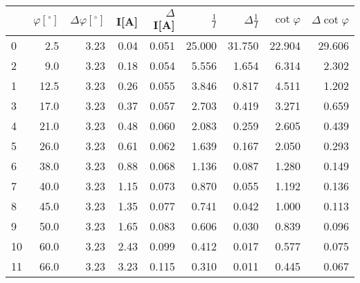 \begin{tabular}{lrrrrrrrr}
\toprule
{} &  $\varphi[^\circ]$ &  $\Delta \varphi[^\circ]$ &  I[A] &  $\Delta$I[A] &  $\frac{1}{I}$ &  $\Delta \frac{1}{I}$ &  $\cot{\varphi}$ &  $\Delta \cot{\varphi}$ \\
\midrule
0  &                2.5 &                     3.23 &  0.04 &         0.051 &         25.000 &                31.750 &           22.904 &                  29.606 \\
2  &                9.0 &                     3.23 &  0.18 &         0.054 &          5.556 &                 1.654 &            6.314 &                   2.302 \\
1  &               12.5 &                     3.23 &  0.26 &         0.055 &          3.846 &                 0.817 &            4.511 &                   1.202 \\
3  &               17.0 &                     3.23 &  0.37 &         0.057 &          2.703 &                 0.419 &            3.271 &                   0.659 \\
4  &               21.0 &                     3.23 &  0.48 &         0.060 &          2.083 &                 0.259 &            2.605 &                   0.439 \\
5  &               26.0 &                     3.23 &  0.61 &         0.062 &          1.639 &                 0.167 &            2.050 &                   0.293 \\
6  &               38.0 &                     3.23 &  0.88 &         0.068 &          1.136 &                 0.087 &            1.280 &                   0.149 \\
7  &               40.0 &                     3.23 &  1.15 &         0.073 &          0.870 &                 0.055 &            1.192 &                   0.136 \\
8  &               45.0 &                     3.23 &  1.35 &         0.077 &          0.741 &                 0.042 &            1.000 &                   0.113 \\
9  &               50.0 &                     3.23 &  1.65 &         0.083 &          0.606 &                 0.030 &            0.839 &                   0.096 \\
10 &               60.0 &                     3.23 &  2.43 &         0.099 &          0.412 &                 0.017 &            0.577 &                   0.075 \\
11 &               66.0 &                     3.23 &  3.23 &         0.115 &          0.310 &                 0.011 &            0.445 &                   0.067 \\
\bottomrule
\end{tabular}

